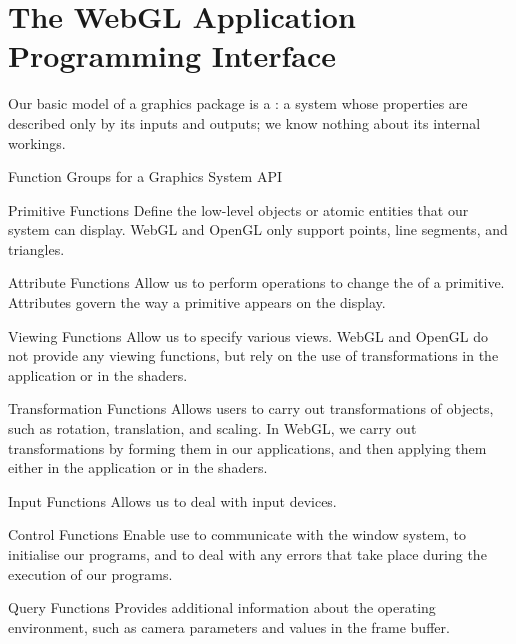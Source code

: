 \documentclass[../notes.tex]{subfiles}
\begin{document}
    \pagebreak

    \section[The WebGL Application Programming Interface] {The WebGL Application Programming Interface}
      Our basic model of a graphics package is a :
      a system whose properties are described only by its inputs and outputs;
      we know nothing about its internal workings.

      \begin{sidenote}{Function Groups for a Graphics System API}
        $ $\vspace{-1em}
        \begin{descriptenum}[nosep]
          \item[Primitive Functions] Define the low-level objects or atomic entities
            that our system can display.
            WebGL and OpenGL only support points, line segments, and triangles.
          \item[Attribute Functions] Allow us to perform operations to change the
             of a primitive.
            Attributes govern the way a primitive appears on the display.
          \item[Viewing Functions] Allow us to specify various views.
            WebGL and OpenGL do not provide any viewing functions,
            but rely on the use of transformations in the application or in the shaders.
          \item[Transformation Functions] Allows users to carry out transformations of objects,
            such as rotation, translation, and scaling.
            In WebGL, we carry out transformations by forming them in our applications,
            and then applying them either in the application or in the shaders.
          \item[Input Functions] Allows us to deal with input devices.
          \item[Control Functions] Enable use to communicate with the window system,
            to initialise our programs, and to deal with any errors that take place
            during the execution of our programs.
          \item[Query Functions] Provides additional information about the operating environment,
            such as camera parameters and values in the frame buffer.
        \end{descriptenum}
      \end{sidenote}
\end{document}
